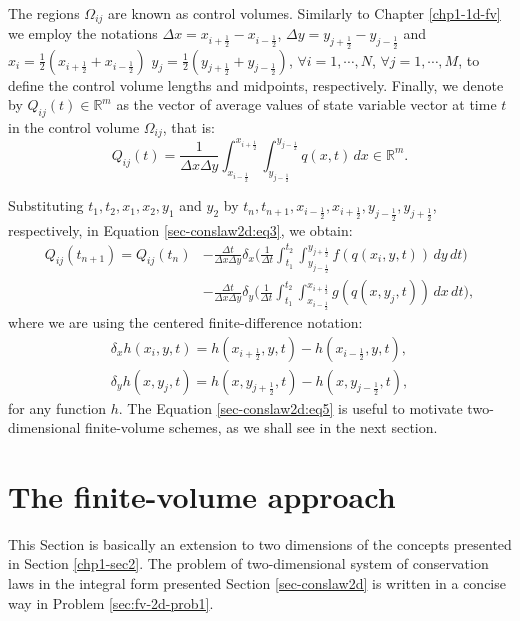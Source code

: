 The regions $\Omega_{ij}$ are known as control volumes. 
Similarly to  Chapter \ref{chp1-1d-fv} we employ the notations
$\Delta x = x_{i+\frac{1}{2}} - x_{i-\frac{1}{2}}$,
$\Delta y = y_{j+\frac{1}{2}} - y_{j-\frac{1}{2}}$ 
and $x_i = \frac{1}{2}(x_{i+\frac{1}{2}} + x_{i-\frac{1}{2}})$
$y_j = \frac{1}{2}(y_{j+\frac{1}{2}} + y_{j-\frac{1}{2}})$, $\forall i = 1, \cdots, N$, 
$\forall j = 1, \cdots, M$,
to define the control volume lengths and midpoints, respectively.
Finally, we denote by ${Q}_{ij}(t) \in \mathbb{R}^m$ as the vector of 
average values of state variable vector at time $t$
in the control volume $\Omega_{ij}$, that is:
\begin{equation}
	\label{sec-conslaw2d:eq4}
	{Q}_{ij}(t) = \frac{1}{\Delta x \Delta y}
	\int_{x_{i-\frac{1}{2}}}^{x_{i+\frac{1}{2}}} \int_{y_{j-\frac{1}{2}}}^{y_{j-\frac{1}{2}}} {q}(x,t) \,dx
	\in \mathbb{R}^m.
\end{equation}

Substituting $t_1, t_2, x_1, x_2, y_1$ and $y_2$ by 
$t_{n}, t_{n+1}, x_{i-\frac{1}{2}}, x_{i+\frac{1}{2}}, y_{j-\frac{1}{2}}, y_{j+\frac{1}{2}}$,
respectively, in Equation \eqref{sec-conslaw2d:eq3}, we obtain:
\begin{align}
	\label{sec-conslaw2d:eq5}
	{Q}_{ij}(t_{n+1})  = {Q}_{ij}(t_{n})
	&- \frac{\Delta t}{\Delta x \Delta y}
	\delta _x \bigg( \frac{1}{\Delta t}
	\int_{t_1}^{t_2} \int_{y_{j-\frac{1}{2}}}^{y_{j+\frac{1}{2}}} 
	{f}({q}(x_{i}, y, t))
	\,dy \,dt \bigg) \\ \nonumber
	&- \frac{\Delta t}{\Delta x \Delta y}
	\delta _y \bigg( \frac{1}{\Delta t}
	\int_{t_1}^{t_2} \int_{x_{i-\frac{1}{2}}}^{x_{i+\frac{1}{2}}} 
	{g}({q}(x, y_{j}, t))
	\,dx \,dt \bigg),
\end{align}
where we are using the centered finite-difference notation:
\begin{align}
	\label{sec-conslaw2d:eq6}
	\delta_x {h}(x_i,y, t) = 
	{h}(x_{i+\frac{1}{2}}, y, t) - 
	{h}(x_{i-\frac{1}{2}}, y, t), \\
	\delta_y {h}(x, y_j,t) = 
    {h}(x, y_{j+\frac{1}{2}},t) - 
    {h}(x, y_{j-\frac{1}{2}},t),
\end{align}
for any function ${h}$. The Equation \eqref{sec-conslaw2d:eq5} is useful to
motivate two-dimensional finite-volume schemes, as we shall see in the next section.

\section{The finite-volume approach}
\label{sec:fv-2d}
This Section is basically an extension to two dimensions 
of the concepts presented in Section \ref{chp1-sec2}.
The problem of two-dimensional system of conservation laws in the integral form 
presented Section \ref{sec-conslaw2d} is written in a concise way in Problem \ref{sec:fv-2d-prob1}.


